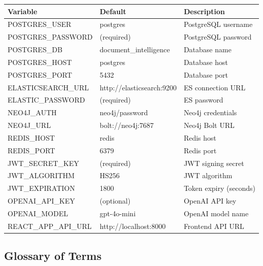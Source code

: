 \begin{table}[h]
\centering
\caption{Complete Environment Variables}
\begin{longtable}{p{}p{}p{}}
\toprule
\textbf{Variable} & \textbf{Default} & \textbf{Description} \\
\midrule
POSTGRES\_USER & postgres & PostgreSQL username \\
POSTGRES\_PASSWORD & (required) & PostgreSQL password \\
POSTGRES\_DB & document\_intelligence & Database name \\
POSTGRES\_HOST & postgres & Database host \\
POSTGRES\_PORT & 5432 & Database port \\
\addlinespace
ELASTICSEARCH\_URL & http://elasticsearch:9200 & ES connection URL \\
ELASTIC\_PASSWORD & (required) & ES password \\
\addlinespace
NEO4J\_AUTH & neo4j/password & Neo4j credentials \\
NEO4J\_URL & bolt://neo4j:7687 & Neo4j Bolt URL \\
\addlinespace
REDIS\_HOST & redis & Redis host \\
REDIS\_PORT & 6379 & Redis port \\
\addlinespace
JWT\_SECRET\_KEY & (required) & JWT signing secret \\
JWT\_ALGORITHM & HS256 & JWT algorithm \\
JWT\_EXPIRATION & 1800 & Token expiry (seconds) \\
\addlinespace
OPENAI\_API\_KEY & (optional) & OpenAI API key \\
OPENAI\_MODEL & gpt-4o-mini & OpenAI model name \\
\addlinespace
REACT\_APP\_API\_URL & http://localhost:8000 & Frontend API URL \\
\bottomrule
\end{longtable}
\end{table}

\subsection{Glossary of Terms}

